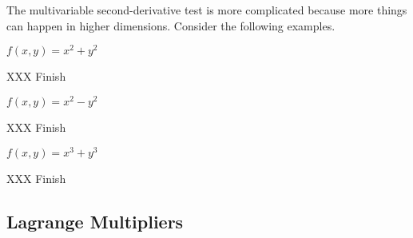 The multivariable second-derivative test is more complicated because more
things can happen in higher dimensions.  Consider the following examples.

\begin{example}
	$f(x,y)=x^2+y^2$

	XXX Finish
\end{example}

\begin{example}
	$f(x,y)=x^2-y^2$

	XXX Finish
\end{example}

\begin{example}
	$f(x,y)=x^3+y^3$

	XXX Finish
\end{example}

\subsection{Lagrange Multipliers}

\begin{exercises}
\end{exercises}

